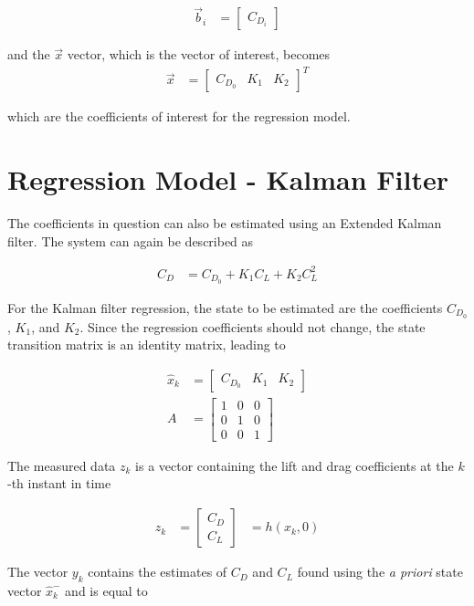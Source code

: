 \begin{align}
\vec{b}_i &=
\begin{bmatrix}
C_{D_i}
\end{bmatrix}
\end{align}

and the $\vec{x}$ vector, which is the vector of interest, becomes
\begin{align}
\vec{x} &=
\begin{bmatrix}
C_{D_0} & K_1 & K_2
\end{bmatrix}^T
\end{align}

which are the coefficients of interest for the regression model.
\section{Regression Model - Kalman Filter}
The coefficients in question can also be estimated using an Extended Kalman filter. The system can again be described as 

\begin{align}
C_D &= C_{D_0}+K_1C_L+K_2C^2_L
\end{align}

For the Kalman filter regression, the state to be estimated are the coefficients $C_{D_0}$, $K_1$, and $K_2$. Since the regression coefficients should not change, the state transition matrix is an identity matrix, leading to

\begin{align}
\hat{x}_k &= \begin{bmatrix}
C_{D_0} & K_1 & K_2
\end{bmatrix}\\
A &= \begin{bmatrix}
1&0&0\\0&1&0\\0&0&1
\end{bmatrix}
\end{align}


The measured data $z_k$ is a vector containing the lift and drag coefficients at the $k$-th instant in time

\begin{align}
z_k &= \begin{bmatrix}
C_D\\C_L
\end{bmatrix} &= h(x_{k},0)
\end{align}


The vector $y_k$ contains the estimates of $C_D$ and $C_L$ found using the \textit{a priori} state vector $\hat{x}^-_k$ and is equal to


